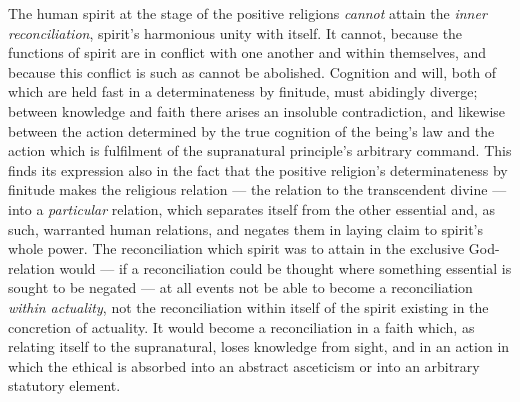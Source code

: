 \documentclass[12pt,a4paper]{book}
\begin{document}
The human spirit at the stage of the positive religions \emph{cannot} attain
the \emph{inner reconciliation}, spirit's harmonious unity with itself. It
cannot, because the functions of spirit are in conflict with one another and
within themselves, and because this conflict is such as cannot be abolished.
Cognition and will, both of which are held fast in a determinateness by
finitude, must abidingly diverge; between knowledge and faith there arises an
insoluble contradiction, and likewise between the action determined by the
true cognition of the being's law and the action which is fulfilment of the
supranatural principle's arbitrary command. This finds its expression also in
the fact that the positive religion's determinateness by finitude makes the
religious relation --- the relation to the transcendent divine --- into a
\emph{particular} relation, which separates itself from the other essential
and, as such, warranted human relations, and negates them in laying claim to
spirit's whole power. The reconciliation which spirit was to attain in the
exclusive God-relation would --- if a reconciliation could be thought where
something essential is sought to be negated --- at all events not be able to
become a reconciliation \emph{within actuality}, not the reconciliation within
itself of the spirit existing in the concretion of actuality. It would become
a reconciliation in a faith which, as relating itself to the supranatural,
loses knowledge from sight, and in an action in which the ethical is absorbed
into an abstract asceticism or into an arbitrary statutory element.
\end{document}
